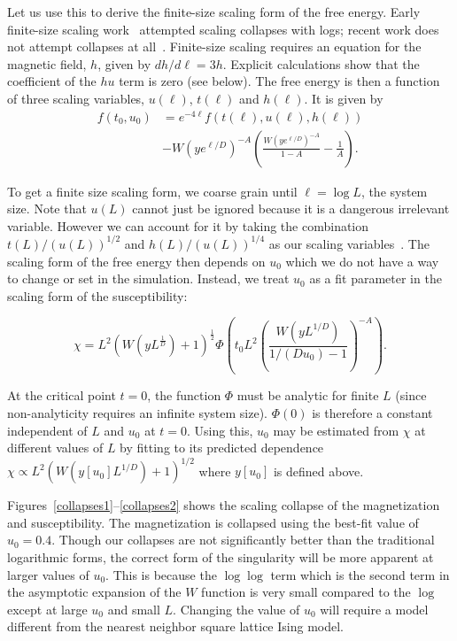 \documentclass[
 reprint,
 amsmath,amssymb,
 aps, superscriptaddress, pre
]{revtex4-1}
\begin{document}
Let us use this to derive the finite-size scaling form of the free energy. Early finite-size scaling work~\cite{aktekin2001finite, lai1990finite, montvay1987numerical} attempted scaling collapses with logs; recent work does not attempt collapses at all~\cite{lundow2009critical}. Finite-size scaling requires an equation for the magnetic field, $h$, given by $dh/d\ell = 3 h$. Explicit calculations show that the coefficient of the $h u$ term is zero (see below). The free energy is then a function of three scaling variables, $u(\ell)$, $t(\ell)$ and $h(\ell)$. It is given by 
\begin{align}
    f(t_0, u_0) &= e^{-4 \ell} f(t(\ell), u(\ell), h(\ell))\nonumber\\
    &-  W(y e^{\ell/D})^{-A} \left( \frac{W(y e^{\ell/D})^{-A}}{1 - A}-\frac{1}{A}\right).
\end{align}

 To get a finite size scaling form, we coarse grain until $\ell = \log L$, the system size. Note that $u(L)$ cannot just be ignored because it is a dangerous irrelevant variable. However we can account for it by taking the combination $t(L)/(u(L))^{1/2}$ and $h(L)/(u(L))^{1/4}$ as our scaling variables~\cite{binder1985finite}. The scaling form of the free energy then depends on $u_0$ which we do not have a way to change or set in the simulation. Instead, we treat $u_0$ as a fit parameter in the scaling form of the susceptibility: 

\begin{equation}
 \chi = L^2 \left(W(y L^{\frac{1}{D}}) + 1\right)^{\frac{1}{2}} \Phi \left( t_0 L^2 \left(\frac{W(y L^{1/D})}{1/(D u_0) - 1}\right)^{-A}\right).
\end{equation}

\noindent At the critical point $t = 0$, the function $\Phi$ must be analytic for
finite $L$ (since non-analyticity requires an infinite system size).
$\Phi(0)$ is therefore a constant independent of $L$ and $u_0$ at $t =
0$. Using this, $u_0$ may be estimated from $\chi$ at different values
of $L$ by fitting to its predicted dependence 
$\chi \propto L^2 (W(y[u_0] L^{1/D}) + 1)^{1/2}$ where 
$y[u_0]$ is defined above.


Figures~\ref{collapses1}--\ref{collapses2} shows the scaling collapse of the magnetization
and susceptibility. The magnetization is collapsed using the best-fit value of $u_0=0.4$. Though our collapses are not significantly
better than the traditional logarithmic forms, the
correct form of the singularity will be more apparent at larger values
of $u_0$. This is because the $\log \log$ term which is the second term in the asymptotic expansion of the $W$ function is very small compared to the $\log$ except at large $u_0$ and small $L$. Changing the value of $u_0$ will require a model different from the nearest neighbor square lattice Ising model.
\end{document}
